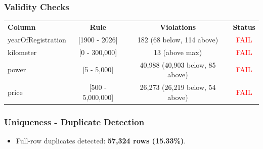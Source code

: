 \documentclass[12pt, a4paper]{article}
\begin{document}
\subsubsection{Validity Checks}
\vspace{0.25cm}
\begin{center}
\renewcommand{\arraystretch}{1.4}
\begin{tabular}{l c c c}
\rowcolor{slate}
{\color{white}\small\bfseries Column} &
{\color{white}\small\bfseries Rule} &
{\color{white}\small\bfseries Violations} &
{\color{white}\small\bfseries Status} \\
\rowcolor{lightgray} yearOfRegistration & [1900 - 2026] & 182 (68 below, 114 above) & \textcolor{red}{FAIL} \\
\rowcolor{white} kilometer & [0 - 300,000] & 13 (above max) & \textcolor{red}{FAIL} \\
\rowcolor{lightgray} power & [5 - 5,000] & 40,988 (40,903 below, 85 above) &\textcolor{red}{FAIL} \\
\rowcolor{white} price & [500 - 5,000,000] & 26,273 (26,219 below, 54 above) & \textcolor{red}{FAIL} \\
\end{tabular}
\end{center}
\vspace{0.25cm}

\subsubsection{Uniqueness - Duplicate Detection}

\begin{itemize}
  \item Full-row duplicates detected: \textbf{57,324 rows (15.33\%)}.
\end{itemize}


\end{document}
